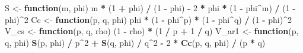 \documentclass[
  11pt,
]{article}
\newenvironment{Shaded}{\begin{snugshade}}{\end{snugshade}}
\newcommand{\ControlFlowTok}[1]{\textcolor[rgb]{0.13,0.29,0.53}{\textbf{#1}}}
\newcommand{\DecValTok}[1]{\textcolor[rgb]{0.00,0.00,0.81}{#1}}
\newcommand{\FunctionTok}[1]{\textcolor[rgb]{0.13,0.29,0.53}{\textbf{#1}}}
\newcommand{\NormalTok}[1]{#1}
\newcommand{\OtherTok}[1]{\textcolor[rgb]{0.56,0.35,0.01}{#1}}
\newcommand{\SpecialCharTok}[1]{\textcolor[rgb]{0.81,0.36,0.00}{\textbf{#1}}}
\begin{document}
\begin{Shaded}
\begin{Highlighting}[]
\NormalTok{S  }\OtherTok{\textless{}{-}} \ControlFlowTok{function}\NormalTok{(m, phi) m }\SpecialCharTok{*}\NormalTok{ (}\DecValTok{1} \SpecialCharTok{+}\NormalTok{ phi) }\SpecialCharTok{/}\NormalTok{ (}\DecValTok{1} \SpecialCharTok{{-}}\NormalTok{ phi) }\SpecialCharTok{{-}}
        \DecValTok{2} \SpecialCharTok{*}\NormalTok{ phi }\SpecialCharTok{*}\NormalTok{ (}\DecValTok{1} \SpecialCharTok{{-}}\NormalTok{ phi}\SpecialCharTok{\^{}}\NormalTok{m) }\SpecialCharTok{/}\NormalTok{ (}\DecValTok{1} \SpecialCharTok{{-}}\NormalTok{ phi)}\SpecialCharTok{\^{}}\DecValTok{2}
\NormalTok{Cc }\OtherTok{\textless{}{-}} \ControlFlowTok{function}\NormalTok{(p, q, phi) phi }\SpecialCharTok{*}\NormalTok{ (}\DecValTok{1} \SpecialCharTok{{-}}\NormalTok{ phi}\SpecialCharTok{\^{}}\NormalTok{p) }\SpecialCharTok{*}\NormalTok{ (}\DecValTok{1} \SpecialCharTok{{-}}\NormalTok{ phi}\SpecialCharTok{\^{}}\NormalTok{q) }\SpecialCharTok{/}\NormalTok{ (}\DecValTok{1} \SpecialCharTok{{-}}\NormalTok{ phi)}\SpecialCharTok{\^{}}\DecValTok{2}
\NormalTok{V\_cs  }\OtherTok{\textless{}{-}} \ControlFlowTok{function}\NormalTok{(p, q, rho) (}\DecValTok{1} \SpecialCharTok{{-}}\NormalTok{ rho) }\SpecialCharTok{*}\NormalTok{ (}\DecValTok{1} \SpecialCharTok{/}\NormalTok{ p }\SpecialCharTok{+} \DecValTok{1} \SpecialCharTok{/}\NormalTok{ q)}
\NormalTok{V\_ar1 }\OtherTok{\textless{}{-}} \ControlFlowTok{function}\NormalTok{(p, q, phi) }\FunctionTok{S}\NormalTok{(p, phi) }\SpecialCharTok{/}\NormalTok{ p}\SpecialCharTok{\^{}}\DecValTok{2} \SpecialCharTok{+} \FunctionTok{S}\NormalTok{(q, phi) }\SpecialCharTok{/}\NormalTok{ q}\SpecialCharTok{\^{}}\DecValTok{2} \SpecialCharTok{{-}}
           \DecValTok{2} \SpecialCharTok{*} \FunctionTok{Cc}\NormalTok{(p, q, phi) }\SpecialCharTok{/}\NormalTok{ (p }\SpecialCharTok{*}\NormalTok{ q)}


\end{Highlighting}
\end{Shaded}
\end{document}
